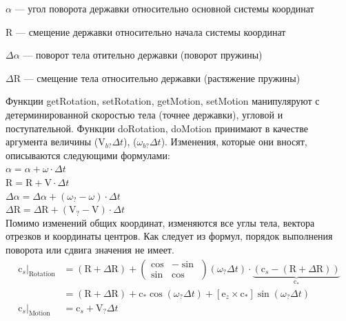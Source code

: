 \documentclass[14pt]{extreport}
\newcommand{\br}[1]{\boldsymbol{\mathrm{#1}}}
\renewcommand{\vec}[1]{\br{#1}}
\newenvironment{packed_itemize}{
\begin{itemize}
  \setlength{\itemsep}{1pt}
  \setlength{\parskip}{0pt}
  \setlength{\parsep}{0pt}
}{\end{itemize}}
\begin{document}
\begin{packed_itemize}
\item $\alpha$ --- угол поворота державки относительно основной системы координат
\item $\vec R$ --- смещение державки относительно начала системы координат
\item $\Delta \alpha$ --- поворот тела отительно державки (поворот пружины)
\item $\Delta \vec R$ --- смещение тела относительно державки (растяжение пружины)
\end{packed_itemize}

Функции getRotation, setRotation, getMotion, setMotion манипуляруют с детерминированной скоростью тела (точнее державки), угловой и поступательной.
Функции doRotation, doMotion принимают в качестве аргумента величины ($\vec V_{b?} \Delta t$), ($\omega_{b?} \Delta t$). Изменения, которые они вносят, описываются следующими формулами:\\
$\alpha = \alpha + \omega \cdot \Delta t$\\
$\vec R = \vec R + \vec V \cdot \Delta t$\\
$\Delta \alpha = \Delta \alpha + (\omega_{?} - \omega) \cdot \Delta t$\\
$\Delta \vec R = \Delta \vec R + (\vec V_{?} - \vec V) \cdot \Delta t$\\

Помимо изменений общих координат, изменяются все углы тела, вектора отрезков и координаты центров. Как следует из формул, порядок выполнения поворота или сдвига значения не имеет.
\begin{equation*}
\begin{split}
\vec c_s \vert_\text{Rotation}
& = (\vec R + \Delta \vec R) +
\begin{pmatrix}
\cos & -\sin \\ \sin & \cos
\end{pmatrix}
(\omega_? \Delta t) \cdot \underbrace{(\vec c_s - (\vec R + \Delta \vec R))}_{\vec c_*}\\
& = (\vec R + \Delta \vec R) + \vec c_* \cos(\omega_? \Delta t) + [\vec e_z \times \vec c_*] \sin(\omega_? \Delta t)
\\ \vec c_s \vert_\text{Motion} &= \vec c_s + \vec V_? \Delta t
\end{split}
\end{equation*}
\end{document}
